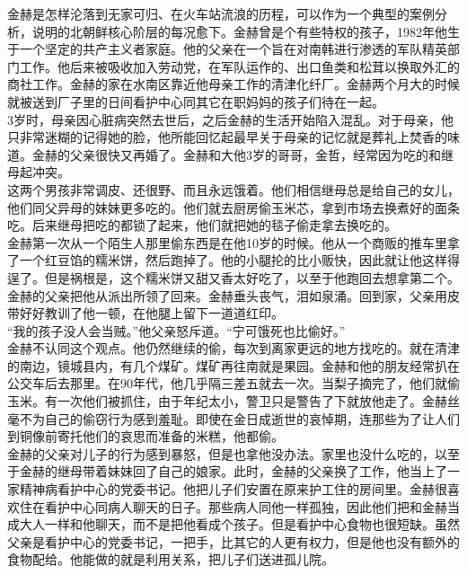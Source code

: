 金赫是怎样沦落到无家可归、在火车站流浪的历程，可以作为一个典型的案例分析，说明的北朝鲜核心阶层的每况愈下。金赫曾是个有些特权的孩子，1982年他生于一个坚定的共产主义者家庭。他的父亲在一个旨在对南韩进行渗透的军队精英部门工作。他后来被吸收加入劳动党，在军队运作的、出口鱼类和松茸以换取外汇的商社工作。金赫的家在水南区靠近他母亲工作的清津化纤厂。金赫两个月大的时候就被送到厂子里的日间看护中心同其它在职妈妈的孩子们待在一起。\\

3岁时，母亲因心脏病突然去世后，之后金赫的生活开始陷入混乱。对于母亲，他只非常迷糊的记得她的脸，他所能回忆起最早关于母亲的记忆就是葬礼上焚香的味道。金赫的父亲很快又再婚了。金赫和大他3岁的哥哥，金哲，经常因为吃的和继母起冲突。\\

这两个男孩非常调皮、还很野、而且永远饿着。他们相信继母总是给自己的女儿，他们同父异母的妹妹更多吃的。他们就去厨房偷玉米芯，拿到市场去换煮好的面条吃。后来继母把吃的都锁了起来，他们就把她的毯子偷走拿去换吃的。\\

金赫第一次从一个陌生人那里偷东西是在他10岁的时候。他从一个商贩的推车里拿了一个红豆馅的糯米饼，然后跑掉了。他的小腿抡的比小贩快，因此就让他这样得逞了。但是祸根是，这个糯米饼又甜又香太好吃了，以至于他跑回去想拿第二个。\\

金赫的父亲把他从派出所领了回来。金赫垂头丧气，泪如泉涌。回到家，父亲用皮带好好教训了他一顿，在他腿上留下一道道红印。\\

“我的孩子没人会当贼。”他父亲怒斥道。“宁可饿死也比偷好。”\\

金赫不认同这个观点。他仍然继续的偷，每次到离家更远的地方找吃的。就在清津的南边，镜城县内，有几个煤矿。煤矿再往南就是果园。金赫和他的朋友经常扒在公交车后去那里。在90年代，他几乎隔三差五就去一次。当梨子摘完了，他们就偷玉米。有一次他们被抓住，由于年纪太小，警卫只是警告了下就放他走了。金赫丝毫不为自己的偷窃行为感到羞耻。即使在金日成逝世的哀悼期，连那些为了让人们到铜像前寄托他们的哀思而准备的米糕，他都偷。\\

金赫的父亲对儿子的行为感到暴怒，但是也拿他没办法。家里也没什么吃的，以至于金赫的继母带着妹妹回了自己的娘家。此时，金赫的父亲换了工作，他当上了一家精神病看护中心的党委书记。他把儿子们安置在原来护工住的房间里。金赫很喜欢住在看护中心同病人聊天的日子。那些病人同他一样孤独，因此他们把和金赫当成大人一样和他聊天，而不是把他看成个孩子。但是看护中心食物也很短缺。虽然父亲是看护中心的党委书记，一把手，比其它的人更有权力，但是他也没有额外的食物配给。他能做的就是利用关系，把儿子们送进孤儿院。\\


